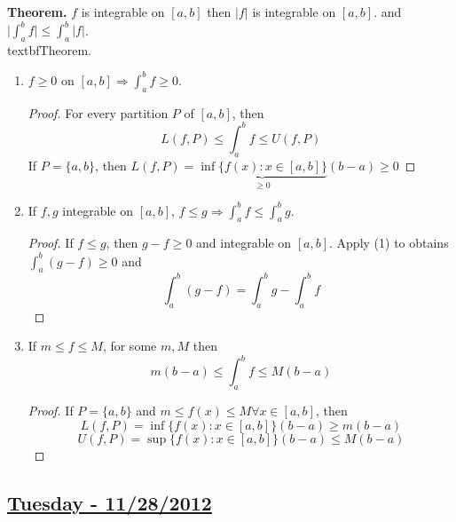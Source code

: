 \documentclass[10pt,letterpaper]{article}
\begin{document}
	\textbf{Theorem. } $f$ is integrable on $[a, b]$ then $|f|$ is integrable on $[a, b]$.
	and $\bigg|\displaystyle\int_{a}^{b} f\bigg| \leq \displaystyle\int_{a}^{b} |f|$. \\
		textbf{Theorem. } 
	\begin{enumerate}
		\item $f \geq 0$ on $[a, b] \Rightarrow \displaystyle\int_{a}^{b} f \geq 0$.
		\begin{proof}
		For every partition $P$ of $[a, b]$, then 
		$$L(f, P) \leq \displaystyle\int_{a}^{b} f \leq U(f, P)$$
		If $P = \{a, b\}$, then
		$L(f, P) = \underbrace{\inf\{f(x) : x \in [a, b]\}}_{\geq 0} (b - a) \geq 0$
		\end{proof}
		\item If $f, g$ integrable on $[a, b]$, $f \leq g \Rightarrow 
		\displaystyle\int_{a}^{b} f \leq \displaystyle\int_{a}^{b} g$.
		\begin{proof}
		If $f \leq g$, then $g - f \geq 0$ and integrable on $[a, b]$.
		Apply (1) to obtains $\displaystyle\int_{a}^{b} (g - f) \geq 0$ and
		$$\displaystyle\int_{a}^{b} (g - f) = \displaystyle\int_{a}^{b} g - 
		\displaystyle\int_{a}^{b} f$$
		\end{proof}
		\item If $m \leq f \leq M$, for some $m, M$ then 
		$$m(b - a) \leq \displaystyle\int_{a}^{b} f \leq M(b - a)$$
		\begin{proof}
		If $P = \{a, b\}$ and $m \leq f(x) \leq M \forall x \in [a, b]$, then
		$$L(f, P) = \inf\{f(x) : x \in [a, b]\}(b - a) \geq m(b - a)$$
		$$U(f, P) = \sup\{f(x) : x \in [a, b]\}(b - a) \leq M(b - a)$$		
		\end{proof}
	\end{enumerate}

	\subsection*{{\color{red}\underline{Tuesday - 11/28/2012}}}
	\text{ } \\
	
\end{document}
